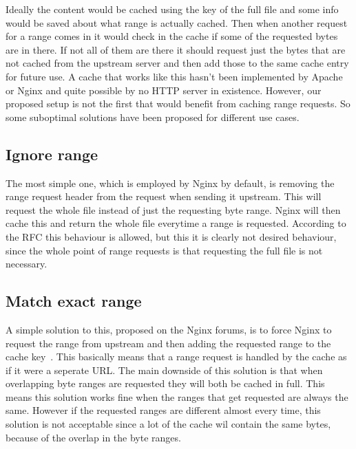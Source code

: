 \documentclass[twoside,openright]{uva-bachelor-thesis}
\begin{document}
Ideally the content would be cached using the key of the full file and some info
would be saved about what range is actually cached. Then when another request
for a range comes in it would check in the cache if some of the requested bytes
are in there. If not all of them are there it should request just the bytes that
are not cached from the upstream server and then add those to the same cache
entry for future use. A cache that works like this hasn't been implemented by
Apache or Nginx and quite possible by no HTTP server in existence. However, our
proposed setup is not the first that would benefit from caching range requests.
So some suboptimal solutions have been proposed for different use cases.

\subsection{Ignore range}
The most simple one, which is employed by Nginx by default, is removing the
range request header from the request when sending it upstream. This will
request the whole file instead of just the requesting byte range. Nginx will
then cache this and return the whole file everytime a range is requested.
According to the RFC this behaviour is allowed, but this it is clearly not
desired behaviour, since the whole point of range requests is that requesting
the full file is not necessary.

\subsection{Match exact range}
A simple solution to this, proposed on the Nginx forums, is to force Nginx to
request the range from upstream and then adding the requested range to the cache
key~\autocite{nginxcacheforum}. This basically means that a range request is
handled by the cache as if it were a seperate URL\@. The main downside of this
solution is that when overlapping byte ranges are requested they will both be
cached in full.  This means this  solution works fine when the ranges that get
requested are always the same. However if the requested ranges are different
almost every time, this solution is not acceptable since a lot of the cache wil
contain the same bytes, because of the overlap in the byte ranges.

\end{document}
